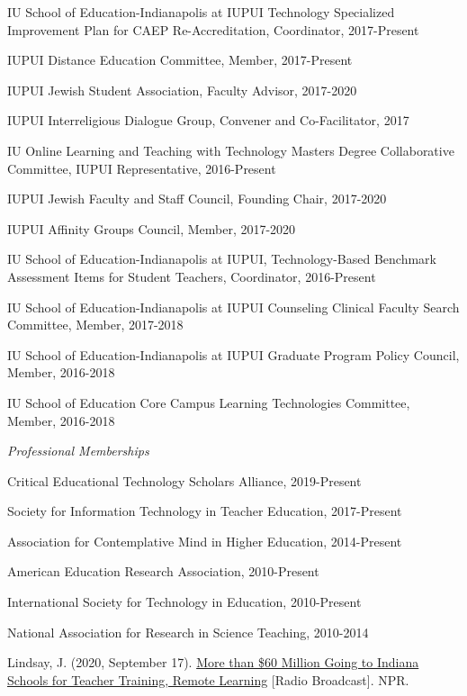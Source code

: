 \documentclass[11pt,article,oneside]{memoir}
\begin{document}
\ind IU School of Education-Indianapolis at IUPUI Technology Specialized Improvement Plan for CAEP Re-Accreditation, Coordinator, 2017-Present

\ind IUPUI Distance Education Committee, Member, 2017-Present

\ind IUPUI Jewish Student Association, Faculty Advisor, 2017-2020

\ind IUPUI Interreligious Dialogue Group, Convener and Co-Facilitator, 2017

\ind IU Online Learning and Teaching with Technology Masters Degree Collaborative Committee, IUPUI Representative, 2016-Present

\ind IUPUI Jewish Faculty and Staff Council, Founding Chair, 2017-2020

\ind IUPUI Affinity Groups Council, Member, 2017-2020

\ind IU School of Education-Indianapolis at IUPUI, Technology-Based Benchmark Assessment Items for Student Teachers, Coordinator, 2016-Present

\ind IU School of Education-Indianapolis at IUPUI Counseling Clinical Faculty Search Committee, Member, 2017-2018

\ind IU School of Education-Indianapolis at IUPUI Graduate Program Policy Council, Member, 2016-2018

\ind IU School of Education Core Campus Learning Technologies Committee, Member, 2016-2018

\medskip

\noindent\emph{Professional Memberships \vspace{0.01in}}

\ind Critical Educational Technology Scholars Alliance, 2019-Present

\ind Society for Information Technology in Teacher Education, 2017-Present

\ind Association for Contemplative Mind in Higher Education, 2014-Present

\ind American Education Research Association, 2010-Present

\ind International Society for Technology in Education, 2010-Present

\ind National Association for Research in Science Teaching, 2010-2014

\bigskip 

\medskip

\ind Lindsay, J. (2020, September 17). \href{https://indianapublicradio.org/news/2020/09/more-than-60-million-going-to-indiana-schools-for-teacher-training-remote-learning/}{More than \$60 Million Going to Indiana Schools for Teacher Training, Remote Learning} [Radio Broadcast]. NPR.
\end{document}
